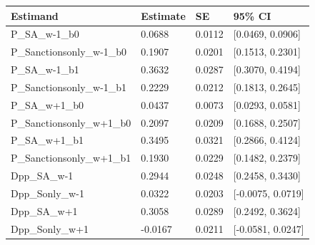 
\begin{tabular}[t]{llll}
\toprule
Estimand & Estimate & SE & 95\% CI\\
\midrule
P\_SA\_w-1\_b0 & 0.0688 & 0.0112 & {}[0.0469, 0.0906]\\
P\_Sanctionsonly\_w-1\_b0 & 0.1907 & 0.0201 & {}[0.1513, 0.2301]\\
P\_SA\_w-1\_b1 & 0.3632 & 0.0287 & {}[0.3070, 0.4194]\\
P\_Sanctionsonly\_w-1\_b1 & 0.2229 & 0.0212 & {}[0.1813, 0.2645]\\
P\_SA\_w+1\_b0 & 0.0437 & 0.0073 & {}[0.0293, 0.0581]\\
P\_Sanctionsonly\_w+1\_b0 & 0.2097 & 0.0209 & {}[0.1688, 0.2507]\\
P\_SA\_w+1\_b1 & 0.3495 & 0.0321 & {}[0.2866, 0.4124]\\
P\_Sanctionsonly\_w+1\_b1 & 0.1930 & 0.0229 & {}[0.1482, 0.2379]\\
Dpp\_SA\_w-1 & 0.2944 & 0.0248 & {}[0.2458, 0.3430]\\
Dpp\_Sonly\_w-1 & 0.0322 & 0.0203 & {}[-0.0075, 0.0719]\\
Dpp\_SA\_w+1 & 0.3058 & 0.0289 & {}[0.2492, 0.3624]\\
Dpp\_Sonly\_w+1 & -0.0167 & 0.0211 & {}[-0.0581, 0.0247]\\
\bottomrule
\end{tabular}
